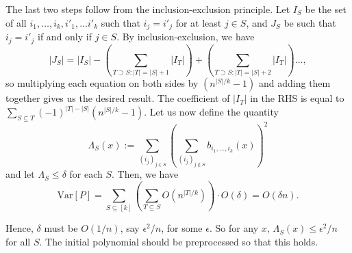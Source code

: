 \documentclass[12pt]{report}
\newcommand{\Var}{\mathrm{Var}}
\begin{document}
The last two steps follow from the inclusion-exclusion principle. Let $I_{S}$ be the set of all $i_1, \ldots,  i_k, i'_1, \ldots i'_k$ such that $i_j = i'_j$ for at least $j \in S$, and $J_{S}$ be such that $i_j = i'_j$ if and only if $j \in S$. By inclusion-exclusion, we have
\begin{equation*}
|J_{S}| = |I_{S}| - \left(\sum_{T \supset S\colon |T| = |S|+1} |I_{T}|\right) + \left(\sum_{T \supset S\colon |T| = |S|+2} |I_{T}|\right) \ldots,
\end{equation*}
so multiplying each equation on both sides by $(n^{|S|/k} - 1)$ and adding them together gives us the desired result. The coefficient of $|I_{T}|$ in the RHS is equal to $\sum_{S \subseteq T} (-1)^{|T| - |S|} (n^{|S|/k} - 1)$. Let us now define the quantity
\begin{equation}
\Lambda_S(x) := \sum_{(i_j)_{j \in S}} \left(\sum_{(i_j)_{j \notin S}} b_{i_1, \ldots, i_k}(x)\right)^2
\end{equation}
and let $\Lambda_S \leq \delta$ for each $S$. Then, we have
\begin{equation*}
\Var[P] = \sum_{S \subseteq [k]} \left(\sum_{T \subseteq S} O(n^{|T|/k})\right) \cdot O(\delta) = O(\delta n).
\end{equation*}

Hence, $\delta$ must be $O(1/n)$, say $\epsilon^2/n$, for some $\epsilon$. So for any $x$, $\Lambda_S(x) \leq \epsilon^2/n$ for all $S$. The initial polynomial should be preprocessed so that this holds.
\end{document}
